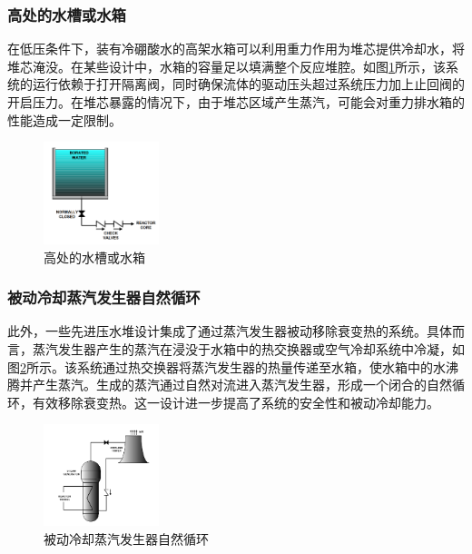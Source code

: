 \documentclass{article}
\begin{document}
\subsubsection{高处的水槽或水箱}

在低压条件下，装有冷硼酸水的高架水箱可以利用重力作用为堆芯提供冷却水，将堆芯淹没。在某些设计中，水箱的容量足以填满整个反应堆腔。如图\ref{fig:high-tank}所示，该系统的运行依赖于打开隔离阀，同时确保流体的驱动压头超过系统压力加上止回阀的开启压力。在堆芯暴露的情况下，由于堆芯区域产生蒸汽，可能会对重力排水箱的性能造成一定限制。\cite{international2009iaea}

\begin{figure}[htbp]
    \centering
    \includegraphics[width=0.3\textwidth]{figures/high-tank.png}
    \caption{高处的水槽或水箱}
    \label{fig:high-tank}
\end{figure}

\subsubsection{被动冷却蒸汽发生器自然循环}

此外，一些先进压水堆设计集成了通过蒸汽发生器被动移除衰变热的系统。具体而言，蒸汽发生器产生的蒸汽在浸没于水箱中的热交换器或空气冷却系统中冷凝，如图\ref{fig:steam-generator}所示。该系统通过热交换器将蒸汽发生器的热量传递至水箱，使水箱中的水沸腾并产生蒸汽。生成的蒸汽通过自然对流进入蒸汽发生器，形成一个闭合的自然循环，有效移除衰变热。这一设计进一步提高了系统的安全性和被动冷却能力。\cite{khanNuclearPowerPlant2020a}

\begin{figure}[htbp]
    \centering
    \includegraphics[width=0.3\textwidth]{figures/steam-generator.png}
    \caption{被动冷却蒸汽发生器自然循环}
    \label{fig:steam-generator}
\end{figure}
\end{document}
